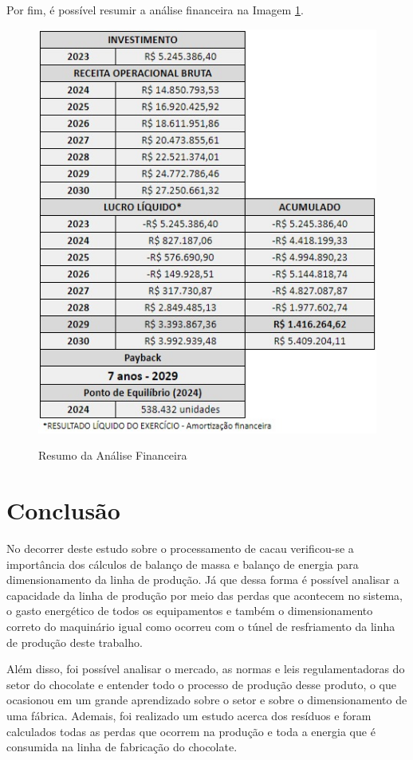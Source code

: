 \documentclass[
	12pt,				%
	openright,			%
	oneside,			%
	a4paper,			%
	english,			%
	french,				%
	spanish,			%
	brazil				%
	]{abntex2}
\begin{document}
Por fim, é possível resumir a análise financeira na Imagem \ref{res}. 

\begin{figure}[H]
\begin{center}
\caption{Resumo da Análise Financeira}
\includegraphics[scale=0.7]{a11.jpeg} 
\label{res}
\end{center}
\end{figure}

\newpage
\chapter{Conclusão}

No decorrer deste estudo sobre o processamento de cacau verificou-se a importância dos cálculos de balanço de massa e balanço de energia para dimensionamento da linha de produção. Já que dessa forma é possível analisar a capacidade da linha de produção por meio das perdas que acontecem no sistema, o gasto energético de todos os equipamentos e também o dimensionamento correto do maquinário igual como ocorreu com o túnel de resfriamento da linha de produção deste trabalho.

Além disso, foi possível analisar o mercado, as normas e leis regulamentadoras do setor do chocolate e entender todo o processo de produção desse produto, o que ocasionou em um grande aprendizado sobre o setor e sobre o dimensionamento de uma fábrica. Ademais, foi realizado um estudo acerca dos resíduos e foram calculados todas as perdas que ocorrem na produção e toda a energia que é consumida na linha de fabricação do chocolate.
\end{document}

